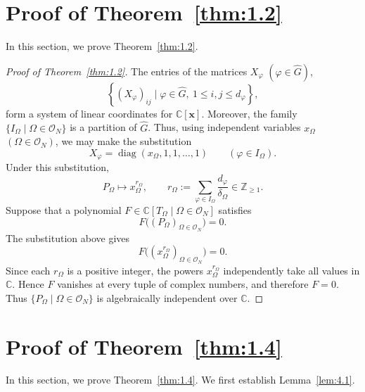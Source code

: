 \documentclass[12pt,a4paper]{article}
\theoremstyle{definition}
\numberwithin{definition}{section}
\begin{document}
\section{Proof of Theorem~\ref{thm:1.2}}
In this section, we prove Theorem~\ref{thm:1.2}.

\begin{proof}[Proof of Theorem~\ref{thm:1.2}]
The entries of the matrices $X_\varphi$ $(\varphi\in\widehat G)$,
\[
\left\{
(X_{\varphi})_{i j}
\mid
\varphi \in \widehat{G}, \
1 \leq i, j \leq d_{\varphi}
\right\},
\]
form a system of linear coordinates for $\mathbb C[\bm{x}]$.
Moreover, the family $\{I_\Omega\mid\Omega\in\mathcal O_N\}$ is a partition of
$\widehat G$.
Thus, using independent variables $x_\Omega$ $(\Omega\in\mathcal O_N)$,
we may make the substitution
\[
X_\varphi=\operatorname{diag}(x_\Omega, 1, 1, \ldots, 1)
\qquad(\varphi \in I_\Omega).
\]
Under this substitution,
\[
P_\Omega\longmapsto x_\Omega^{r_\Omega},
\qquad
r_\Omega:=
\sum_{\varphi\in I_\Omega}\frac{d_\varphi}{\delta_\Omega}
\in\mathbb Z_{\geq 1}.
\]
Suppose that a polynomial
$F \in \mathbb{C}[T_\Omega\mid\Omega\in\mathcal{O}_N]$ satisfies
\[
F\bigl((P_\Omega)_{\Omega\in\mathcal O_N}\bigr)=0.
\]
The substitution above gives
\[
F\bigl((x_\Omega^{r_\Omega})_{\Omega\in\mathcal O_N}\bigr)=0.
\]
Since each $r_\Omega$ is a positive integer,
the powers $x_\Omega^{r_\Omega}$ independently take all values in $\mathbb C$.
Hence $F$ vanishes at every tuple of complex numbers, and therefore $F=0$.
Thus $\{P_\Omega \mid \Omega \in \mathcal{O}_N\}$ is algebraically independent
over $\mathbb C$.
\end{proof}

\section{Proof of Theorem~\ref{thm:1.4}}
In this section, we prove Theorem~\ref{thm:1.4}.
We first establish Lemma~\ref{lem:4.1}.
\end{document}
